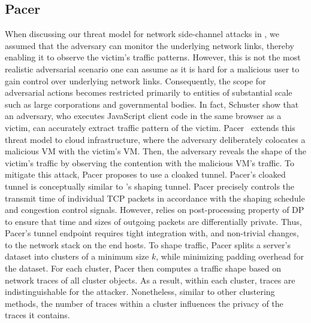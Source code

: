 \subsection{Pacer}\label{subsubsec:background-defenses-pacer}
When discussing our threat model for network side-channel attacks in , we assumed that the adversary can monitor the underlying network links, thereby enabling it to observe the victim's traffic patterns.
However, this is not the most realistic adversarial scenario one can assume as it is hard for a malicious user to gain control over underlying network links.
Consequently, the scope for adversarial actions becomes restricted primarily to entities of substantial scale such as large corporations and governmental bodies.
In fact, Schuster show that an adversary, who executes JavaScript client code in the same browser as a victim, can accurately extract traffic pattern of the victim.
Pacer~\cite{mehta2022pacer} extends this threat model to cloud infrastructure, where the adversary deliberately colocates a malicious VM with the victim's VM.
Then, the adversary reveals the shape of the victim's traffic by observing the contention with the malicious VM's traffic.
To mitigate this attack, Pacer \cite{mehta2022pacer} proposes to use a cloaked tunnel.
Pacer's cloaked tunnel is conceptually similar to {\sys}'s shaping tunnel. 
Pacer precisely controls the transmit time of individual
TCP packets in accordance with the shaping schedule and congestion control
signals. 
However, {\sys} relies on post-processing property of DP to ensure that time and sizes of outgoing packets are differentially private. 
Thus, Pacer's tunnel endpoint requires tight integration with, and
non-trivial changes, to the network stack on the end hosts.
To shape traffic, Pacer splits a server's dataset into clusters of a minimum size $k$, while minimizing padding overhead for the dataset.
For each cluster, Pacer then computes a traffic shape based on network traces of all cluster objects.
As a result, within each cluster, traces are indistinguishable for the attacker. 
Nonetheless, similar to other clustering methods, the number of traces within a cluster influences the privacy of the traces it contains.


